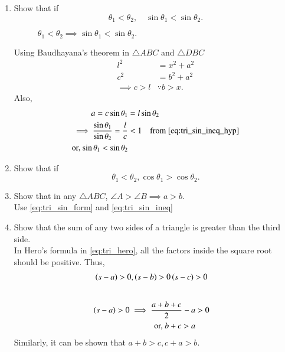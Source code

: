 \renewcommand{\theequation}{\theenumi}
\begin{enumerate}[label=\arabic*.,ref=\thesubsection.\theenumi]
\item
	Show that if
\begin{equation}
\label{ch5_sin_increasing}
\theta_1 < \theta_2, \quad \sin \theta_1 < \sin \theta_2.
\end{equation}	
\begin{figure}[!ht]
	\begin{center}
		
		\resizebox{\columnwidth}{!}{}
	\end{center}
	\caption{$\theta_1 < \theta_2 \implies \sin \theta_1 < \sin \theta_2.$}
	\label{fig:fig_sin_ineq}	
\end{figure}
%
\solution Using Baudhayana's theorem in $\triangle  ABC$ and $\triangle DBC$
%
\begin{align}
l^2 &= x^2+a^2
\\
c^2 &= b^2+a^2
\\
\implies c > l &\because b > x.
\label{eq:tri_sin_ineq_hyp}
\end{align}
%
Also, 
%
\begin{align}
a = c \sin \theta_1 &= l \sin \theta_2
%
\\
\implies 
\frac{\sin \theta_1}{\sin \theta_2} = \frac{l}{c} &< 1 \quad \text{from }\eqref{eq:tri_sin_ineq_hyp}
\\
\text{or, } {\sin \theta_1}<{\sin \theta_2}
\label{eq:tri_sin_ineq}
\end{align}
%
	\item
		Show that if
		\begin{equation}
		\label{ch5_sin_increasing}
		\theta_1 < \theta_2, \cos \theta_1 > \cos \theta_2.
		\end{equation}	
%
\item	Show that in any $\triangle ABC$, $\angle A > \angle B \implies a > b$.
%
\\
\solution Use \eqref{eq:tri_sin_form} and \eqref{eq:tri_sin_ineq}
%
\item Show that the sum of any two sides of a triangle is greater than the third side.
\\
\solution In Hero's formula in \eqref{eq:tri_hero}, all the factors inside the square root should be positive.  Thus, 
%
\begin{align}
\left(s-a\right) > 0, \left(s-b\right) > 0\left(s-c\right) &> 0
\end{align}
%
\begin{align}
\\
\left(s-a\right) > 0 \implies \frac{a+b+c}{2} -a &> 0
\\
\text{or, } b+c > a
\end{align}
%
Similarly, it can be shown that $a+b>c, c+a>b$.



\end{enumerate}
